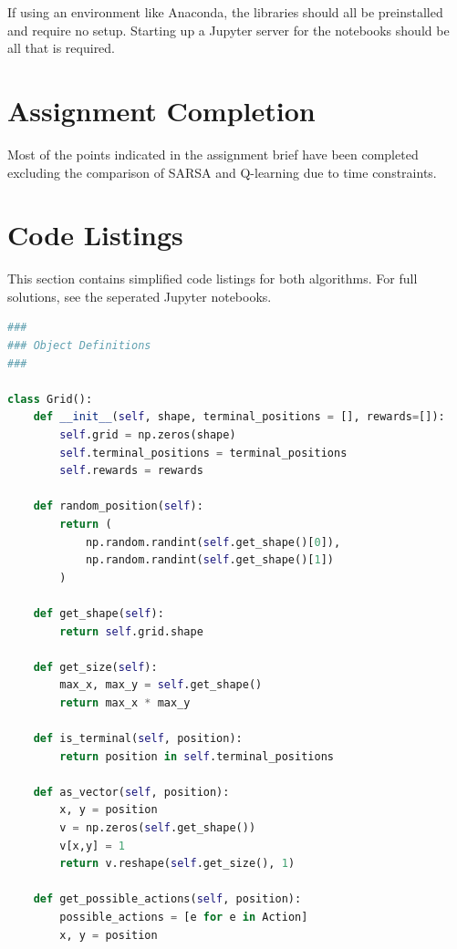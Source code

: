 \documentclass[11pt,journal,transmag,final]{IEEEtran}
\begin{document}
    If using an environment like Anaconda, the libraries should all be preinstalled and require no setup. Starting up a Jupyter server for the notebooks should be all that is required.
    \begin{appendices}
        \section{Assignment Completion}

        Most of the points indicated in the assignment brief have been completed excluding the comparison of SARSA and Q-learning due to time constraints.


        \onecolumn
        \section{Code Listings}

        This section contains simplified code listings for both algorithms. For full solutions, see the seperated Jupyter notebooks.

        \begin{lstlisting}[language=Python, caption=Classes, basicstyle=\footnotesize, label=lst:classes]
###
### Object Definitions
###

class Grid():
    def __init__(self, shape, terminal_positions = [], rewards=[]):
        self.grid = np.zeros(shape)
        self.terminal_positions = terminal_positions
        self.rewards = rewards
        
    def random_position(self):
        return (
            np.random.randint(self.get_shape()[0]),
            np.random.randint(self.get_shape()[1])
        )
    
    def get_shape(self):
        return self.grid.shape
    
    def get_size(self):
        max_x, max_y = self.get_shape()
        return max_x * max_y
    
    def is_terminal(self, position):
        return position in self.terminal_positions
    
    def as_vector(self, position):
        x, y = position
        v = np.zeros(self.get_shape())
        v[x,y] = 1
        return v.reshape(self.get_size(), 1)
    
    def get_possible_actions(self, position):
        possible_actions = [e for e in Action]
        x, y = position
        

\end{lstlisting}
\end{appendices}
\end{document}
